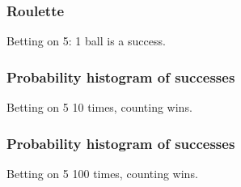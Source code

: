 \documentclass[handout]{beamer}
\begin{document}


   \begin{frame}
   \frametitle{Roulette}
   \begin{center}
   \end{center}
   Betting on {\color{red} 5}: 1 ball is a success.
   \end{frame}



   \begin{frame}
   \frametitle{Probability histogram of successes}
   \begin{center}
   \end{center}
   Betting on {\color{red} 5} 10 times, counting wins.
   \end{frame}



   \begin{frame}
   \frametitle{Probability histogram of successes}
   \begin{center}
   \end{center}
   Betting on {\color{red} 5} 100 times, counting wins.
   \end{frame}
\end{document}
